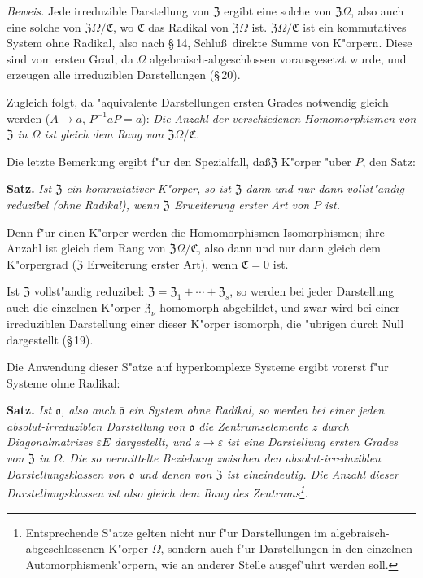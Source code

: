 \documentclass[12pt,a4paper]{article}
\theoremstyle{plain}
\begin{document}
\noindent\textit{Beweis.}
Jede irreduzible Darstellung von $\mathfrak{Z}$ ergibt eine solche von $\mathfrak{Z}\Omega$, also auch eine solche von $\mathfrak{Z}\Omega/\mathfrak{C}$, wo $\mathfrak{C}$ das Radikal von $\mathfrak{Z}\Omega$ ist. $\mathfrak{Z}\Omega/\mathfrak{C}$ ist ein kommutatives System ohne Radikal, also nach \S\,14, Schlu\ss\ direkte Summe von K"orpern. Diese sind vom ersten Grad, da $\Omega$ algebraisch-abgeschlossen vorausgesetzt wurde, und erzeugen alle irreduziblen Darstellungen (\S\,20).

Zugleich folgt, da "aquivalente Darstellungen ersten Grades notwendig gleich werden ($A \to a$, $P^{-1}aP = a$): \textit{Die Anzahl der verschiedenen Homomorphismen von $\mathfrak{Z}$ in $\Omega$ ist gleich dem Rang von $\mathfrak{Z}\Omega/\mathfrak{C}$.}

Die letzte Bemerkung ergibt f"ur den Spezialfall, da\ss $\mathfrak{Z}$ K"orper "uber $P$, den Satz:

\medskip\noindent\textbf{Satz.}
\textit{Ist $\mathfrak{Z}$ ein kommutativer K"orper, so ist $\mathfrak{Z}$ dann und nur dann vollst"andig reduzibel (ohne Radikal), wenn $\mathfrak{Z}$ Erweiterung erster Art von $P$ ist.}

Denn f"ur einen K"orper werden die Homomorphismen Isomorphismen; ihre Anzahl ist gleich dem Rang von $\mathfrak{Z}\Omega/\mathfrak{C}$, also dann und nur dann gleich dem K"orpergrad ($\mathfrak{Z}$ Erweiterung erster Art), wenn $\mathfrak{C} = 0$ ist.

Ist $\mathfrak{Z}$ vollst"andig reduzibel: $\mathfrak{Z} = \mathfrak{Z}_1 + \cdots + \mathfrak{Z}_s$, so werden bei jeder Darstellung auch die einzelnen K"orper $\mathfrak{Z}_\nu$ homomorph abgebildet, und zwar wird bei einer irreduziblen Darstellung einer dieser K"orper isomorph, die "ubrigen durch Null dargestellt (\S\,19).

Die Anwendung dieser S"atze auf hyperkomplexe Systeme ergibt vorerst f"ur Systeme ohne Radikal:

\medskip\noindent\textbf{Satz.}
\textit{Ist $\mathfrak{o}$, also auch $\bar{\mathfrak{o}}$ ein System ohne Radikal, so werden bei einer jeden absolut-irreduziblen Darstellung von $\mathfrak{o}$ die Zentrumselemente $z$ durch Diagonalmatrizes $\varepsilon E$ dargestellt, und $z \to \varepsilon$ ist eine Darstellung ersten Grades von $\mathfrak{Z}$ in $\Omega$. Die so vermittelte Beziehung zwischen den absolut-irreduziblen Darstellungsklassen von $\mathfrak{o}$ und denen von $\mathfrak{Z}$ ist eineindeutig. Die Anzahl dieser Darstellungsklassen ist also gleich dem Rang des Zentrums\footnote{Entsprechende S"atze gelten nicht nur f"ur Darstellungen im algebraisch-abgeschlossenen K"orper $\Omega$, sondern auch f"ur Darstellungen in den einzelnen Automorphismenk"orpern, wie an anderer Stelle ausgef"uhrt werden soll.}.}
\end{document}
